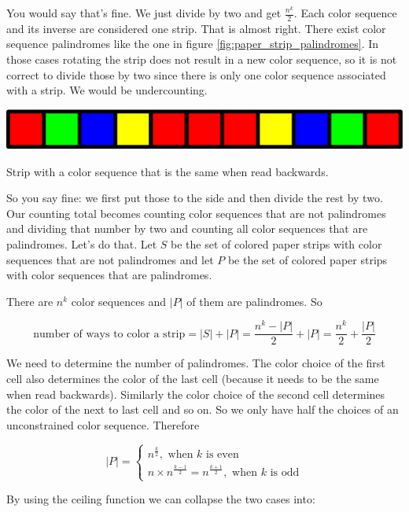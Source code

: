 You would say that's fine. We just divide by two and get $\frac{n^k}{2}$. Each color sequence and its inverse are considered one strip. That is almost right. There exist color sequence palindromes like the one in figure \ref{fig:paper_strip_palindromes}. In those cases rotating the strip does not result in a new color sequence, so it is not correct to divide those by two  since there is only one color sequence associated with a strip. We would be undercounting.

\begin{marginfigure}[0.5in]
\includegraphics[scale=0.3]{paper_strip_palindromes.pdf}
\caption{Strip with a color sequence that is the same when read backwards.}
\label{fig:paper_strip_palindromes}
\end{marginfigure}

So you say fine: we first put those to the side and then divide the rest by two. Our counting total becomes counting color sequences that are not palindromes and dividing that number by two and counting all color sequences that are palindromes. Let's do that. Let $S$ be the set of colored paper strips with color sequences that are not palindromes and let $P$ be the set of colored paper strips with color sequences that are palindromes. 

There are $n^k$ color sequences and $|P|$ of them are palindromes. So

$$
\text{number of ways to color a strip} = |S| + |P| = \frac{n^k - |P|}{2} + |P| = \frac{n^k}{2} + \frac{|P|}{2}
$$

We need to determine the number of palindromes. The color choice of the first cell also determines the color of the last cell (because it needs to be the same when read backwards). Similarly the color choice of the second cell determines the color of the next to last cell and so on. So we only have half the choices of an unconstrained color sequence. Therefore

$$
|P| = 
\begin{cases}
n^{\frac{k}{2}}, \text{ when } k \text{ is even}\\
n \times n^{\frac{k-1}{2}} = n^{\frac{k+1}{2}} , \text{ when } k \text{ is odd}
\end{cases}
$$

By using the ceiling function we can collapse the two cases into: 


